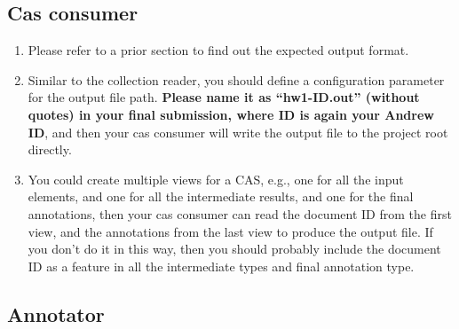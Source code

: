 \subsection{Cas consumer}

\begin{enumerate}
  
\item Please refer to a prior section to find out the expected output format.

\item Similar to the collection reader, you should define a configuration
parameter for the output file path. \textbf{Please name it as ``hw1-ID.out''
(without quotes) in your final submission, where ID is again your Andrew ID},
and then your cas consumer will write the output file to the project root
directly.

\item You could create multiple views for a CAS, e.g., one for all the input
elements, and one for all the intermediate results, and one for the final
annotations, then your cas consumer can read the document ID from the first
view, and the annotations from the last view to produce the output file. If you
don't do it in this way, then you should probably include the document ID as a
feature in all the intermediate types and final annotation type.

\end{enumerate}

\subsection{Annotator}

